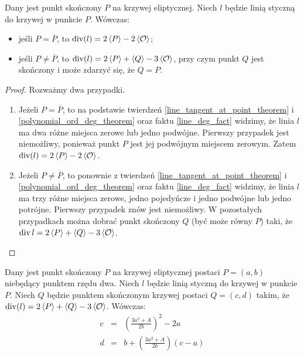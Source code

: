 \begin{theorem}
Dany jest punkt skończony $P$ na krzywej eliptycznej.
Niech $l$ będzie linią styczną do krzywej w punkcie $P$.
Wówczas:
\begin{itemize}
\item jeśli $P = \overline{P}$,
to $\operatorname{div}(l) = 2\left\langle P\right\rangle - 2\left\langle\mathcal{O}\right\rangle$;
\item jeśli $P \neq \overline{P}$,
to $\operatorname{div}(l) = 2\left\langle P\right\rangle + \left\langle Q\right\rangle - 3\left\langle\mathcal{O}\right\rangle$,
przy czym punkt $Q$ jest skończony
i może zdarzyć się, że $Q = P$.
\end{itemize}
\end{theorem}

\begin{proof}
Rozważmy dwa przypadki.
\begin{enumerate}
\item
Jeżeli $P = \overline{P}$,
to na podstawie twierdzeń
\ref{line_tangent_at_point_theorem} i \ref{polynomial_ord_deg_theorem}
oraz faktu \ref{line_deg_fact} widzimy,
że linia $l$ ma dwa różne miejsca zerowe lub jedno podwójne.
Pierwszy przypadek jest niemożliwy,
ponieważ punkt $P$ jest jej podwójnym miejscem zerowym.
Zatem $\operatorname{div}(l) = 2\left\langle P\right\rangle - 2\left\langle\mathcal{O}\right\rangle$.
\item
Jeżeli $P \neq \overline{P}$,
to ponownie z twierdzeń
\ref{line_tangent_at_point_theorem} i \ref{polynomial_ord_deg_theorem}
oraz faktu \ref{line_deg_fact} widzimy,
że linia $l$ ma trzy różne miejsca zerowe, jedno pojedyńcze i jedno podwójne
lub jedno potrójne.
Pierwszy przypadek znów jest niemożliwy.
W pozostałych przypadkach można dobrać punkt skończony $Q$
(być może równy $P$) taki,
że $\operatorname{div}{l} = 2\left\langle P\right\rangle + \left\langle Q\right\rangle - 3\left\langle\mathcal{O}\right\rangle$.
\end{enumerate}
\end{proof}

\begin{theorem}
Dany jest punkt skończony $P$ na krzywej eliptycznej postaci $P = (a, b)$
niebędący punktem rzędu dwa.
Niech $l$ będzie linią styczną do krzywej w punkcie $P$.
Niech $Q$ będzie punktem skończonym krzywej postaci $Q = (c, d)$ takim,
że $\operatorname{div}(l) = 2\left\langle P\right\rangle + \left\langle Q\right\rangle - 3\left\langle\mathcal{O}\right\rangle$.
Wówczas:
\begin{eqnarray}
\label{tangent_line_third_point_x_eqn}
c & = & \left(\frac{3a^2 + A}{2b}\right)^2 - 2a \\
\label{tangent_line_third_point_y_eqn}
d & = & b + \left(\frac{3a^2 + A}{2b}\right)(c - a)
\end{eqnarray}
\end{theorem}

